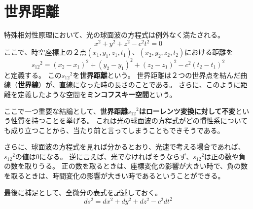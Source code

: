 \documentclass[a4paper]{jsreport}
\begin{document}
        \section{世界距離}
            特殊相対性原理において、光の球面波の方程式は例外なく満たされる。
            \begin{equation}
                x^2 + y^2 + z^2 -c^2t^2 = 0
            \end{equation}
            ここで、時空座標上の２点$(x_1, y_1, z_1, t_1)$、$(x_2, y_2, z_2, t_2)$における距離を
            \begin{equation}
                {s_{12}}^2 = (x_2 - x_1)^2 + (y_2 - y_1)^2 + (z_2 - z_1)^2 - c^2(t_2 - t_1)^2
            \end{equation}
            と定義する。
            この${s_{12}}^2$を\textbf{世界距離}という。
            世界距離は２つの世界点を結んだ曲線（\textbf{世界線}）が、直線になった時の長さのことである。
            さらに、このように距離を定義したような空間を\textbf{ミンコフスキー空間}という。\par
            ここで一つ重要な結論として、\textbf{世界距離${s_{12}}^2$はローレンツ変換に対して不変}という性質を持つことを挙げる。
            これは光の球面波の方程式がどの慣性系についても成り立つことから、当たり前と言ってしまうこともできそうである。\par
            さらに、球面波の方程式を見れば分かるとおり、光速で考える場合であれば、${s_{12}}^2$の値は$0$になる。
            逆に言えば、光でなければそうならず、${s_{12}}^2$は正の数や負の数を取りうる。
            正の数を取るときは、座標変化の影響が大きい時で、負の数を取るときは、時間変化の影響が大きい時であるということができる。\par
            最後に補足として、全微分の表式を記述しておく。
            \begin{equation}
                ds^2 = dx^2 + dy^2 + dz^2 - c^2dt^2
            \end{equation}
\end{document}
